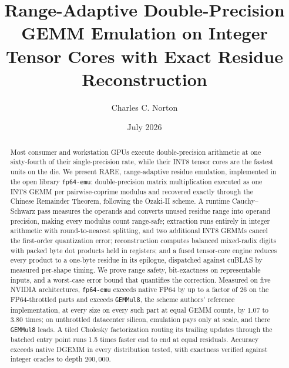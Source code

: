 \documentclass[11pt]{amsart}
\theoremstyle{plain}
\theoremstyle{definition}
\newcommand{\code}[1]{\texttt{#1}}
\newcommand{\fpemu}{\code{fp64-emu}}
\newcommand{\gemmul}{\code{GEMMul8}}
\begin{document}
\title[Range-adaptive residue emulation of FP64 GEMM]{Range-Adaptive Double-Precision GEMM Emulation on Integer Tensor Cores with Exact Residue Reconstruction}
\author{Charles C. Norton}
\date{July 2026}

\begin{abstract}
Most consumer and workstation GPUs execute double-precision arithmetic at
one sixty-fourth of their single-precision rate, while their INT8 tensor
cores are the fastest units on the die. We present RARE, range-adaptive
residue emulation, implemented in the open library \fpemu{}:
double-precision matrix multiplication executed as one INT8 GEMM per
pairwise-coprime modulus and recovered exactly through the Chinese
Remainder Theorem, following the Ozaki-II scheme. A runtime
Cauchy--Schwarz pass measures the operands and converts unused residue
range into operand precision, making every modulus count range-safe;
extraction runs entirely in integer arithmetic with round-to-nearest
splitting, and two additional INT8 GEMMs cancel the first-order
quantization error; reconstruction computes balanced mixed-radix digits
with packed byte dot products held in registers; and a fused tensor-core
engine reduces every product to a one-byte residue in its epilogue,
dispatched against cuBLAS by measured per-shape timing. We prove range
safety, bit-exactness on representable inputs, and a worst-case error
bound that quantifies the correction. Measured on five NVIDIA
architectures, \fpemu{} exceeds native FP64 by up to a factor of 26 on
the FP64-throttled parts and exceeds \gemmul{}, the scheme authors'
reference implementation, at every size on every such part at equal GEMM
counts, by 1.07 to 3.80 times; on unthrottled datacenter silicon,
emulation pays only at scale, and there \gemmul{} leads. A tiled Cholesky
factorization routing its trailing updates through the batched entry
point runs 1.5 times faster end to end at equal residuals. Accuracy
exceeds native DGEMM in every distribution tested, with exactness
verified against integer oracles to depth $200{,}000$.
\end{abstract}

\maketitle
\end{document}
